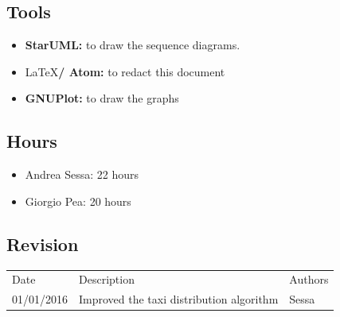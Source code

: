 \documentclass[11pt,titlepage]{article} %
\begin{document}
	\subsection{Tools}
		\begin{itemize}
			\item \textbf{StarUML:} to draw the sequence diagrams.
			\item \LaTeX \textbf{/ Atom:} to redact this document
			\item \textbf{GNUPlot:} to draw the graphs
		\end{itemize}

	\subsection{Hours}
		\begin{itemize}
			\item Andrea Sessa: 22 hours
			\item Giorgio Pea: 20 hours
		\end{itemize}
	\subsection{Revision}
		\begin{table}[h]
		\centering
		\begin{tabular}{lll}
		Date       & Description & Authors    \\
		01/01/2016 & Improved the taxi distribution algorithm & Sessa \\
		\end{tabular}
		\end{table}
\end{document}
